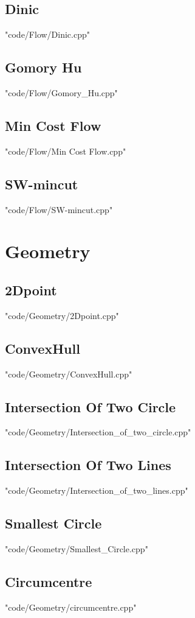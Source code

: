 \subsection{Dinic}
 {"code/Flow/Dinic.cpp"}
\subsection{Gomory Hu}
 {"code/Flow/Gomory_Hu.cpp"}
\subsection{Min Cost Flow}
 {"code/Flow/Min Cost Flow.cpp"}
\subsection{SW-mincut}
 {"code/Flow/SW-mincut.cpp"}
\section{Geometry}
\subsection{2Dpoint}
 {"code/Geometry/2Dpoint.cpp"}
\subsection{ConvexHull}
 {"code/Geometry/ConvexHull.cpp"}
\subsection{Intersection Of Two Circle}
 {"code/Geometry/Intersection_of_two_circle.cpp"}
\subsection{Intersection Of Two Lines}
 {"code/Geometry/Intersection_of_two_lines.cpp"}
\subsection{Smallest Circle}
 {"code/Geometry/Smallest_Circle.cpp"}
\subsection{Circumcentre}
 {"code/Geometry/circumcentre.cpp"}
